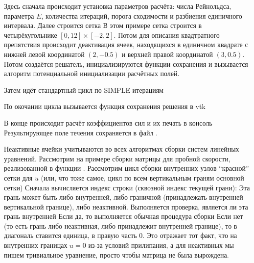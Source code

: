 Здесь сначала происходит установка параметров расчёта: числа Рейнольдса, параметра $E$,
количества итераций, порога сходимости и разбиения единичного интервала.
Далее строится сетка
В этом примере сетка строится в четырёхугольнике $[0, 12]\times[-2,2]$.
Потом для описания квадтратного препятствия 
происходит деактивация ячеек, находящихся в единичном квадрате
с нижней левой координатой $(2, -0.5)$ и верхней правой координатой $(3, 0.5)$.
Потом создаётся решатель, инициализируются функции сохранения
и вызывается алгоритм потенциальной инициализации расчётных полей.

Затем идёт стандартный цикл по SIMPLE-итерациям 

По окочании цикла вызывается функция сохранения решения в vtk

В конце происходит расчёт коэффициентов сил и их печать в консоль
Результирующее поле течения сохраняется в файл .

Неактивные ячейки учитываются во всех алгоритмах
сборки систем линейных уравнений. Рассмотрим на примере сборки
матрицы для пробной скорости, реализованной в функции .
Рассмотрим цикл сборки внутренних узлов ``красной'' сетки для $u$
(или, что тоже самое, цикл по всем вертикальным граням основной сетки)
Сначала вычисляется индекс строки (сквозной индекс текущей грани):
Эта грань может быть либо внутренней, либо граничной (принадлежать внутренней вертикальной границе),
либо неактивной.
Выполняется проверка, является ли эта грань внутренней
Если да, то выполняется обычная процедура сборки
Если нет (то есть грань либо неактивная, либо принадлежит внутренней границе),
то в диагональ ставится единица, в правую часть 0.
Это отражает тот факт, что на внутренних границах $u=0$ из-за условий прилипания,
а для неактивных мы пишем тривиальное уравнение, просто чтобы матрица не была вырождена.

